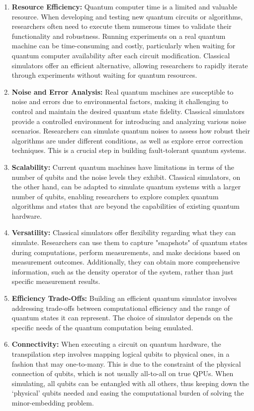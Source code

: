 \begin{enumerate}
    \item {\bf Resource Efficiency:} Quantum computer time is a limited and valuable resource. When developing and testing new quantum circuits or algorithms, researchers often need to execute them numerous times to validate their functionality and robustness. Running experiments on a real quantum machine can be time-consuming and costly, particularly when waiting for quantum computer availability after each circuit modification. Classical simulators offer an efficient alternative, allowing researchers to rapidly iterate through experiments without waiting for quantum resources.
    \item {\bf Noise and Error Analysis:} Real quantum machines are susceptible to noise and errors due to environmental factors, making it challenging to control and maintain the desired quantum state fidelity. Classical simulators provide a controlled environment for introducing and analyzing various noise scenarios. Researchers can simulate quantum noises to assess how robust their algorithms are under different conditions, as well as explore error correction techniques. This is a crucial step in building fault-tolerant quantum systems.
    \item {\bf Scalability:} Current quantum machines have limitations in terms of the number of qubits and the noise levels they exhibit. Classical simulators, on the other hand, can be adapted to simulate quantum systems with a larger number of qubits, enabling researchers to explore complex quantum algorithms and states that are beyond the capabilities of existing quantum hardware.
    \item {\bf Versatility:} Classical simulators offer flexibility regarding what they can simulate. Researchers can use them to capture "snapshots" of quantum states during computations, perform measurements, and make decisions based on measurement outcomes. Additionally, they can obtain more comprehensive information, such as the density operator of the system, rather than just specific measurement results.
    \item {\bf Efficiency Trade-Offs:} Building an efficient quantum simulator involves addressing trade-offs between computational efficiency and the range of quantum states it can represent. The choice of simulator depends on the specific needs of the quantum computation being emulated.
    \item {\bf Connectivity:}
    When executing a circuit on quantum hardware, the transpilation step involves mapping logical qubits to physical ones, in a fashion that may one-to-many. This is due to the constraint of the physical connection of qubits, which is not usually all-to-all on true QPUs. When simulating, all qubits can be entangled with all others, thus keeping down the `physical' qubits needed and easing the computational burden of solving the minor-embedding problem.

\end{enumerate}
